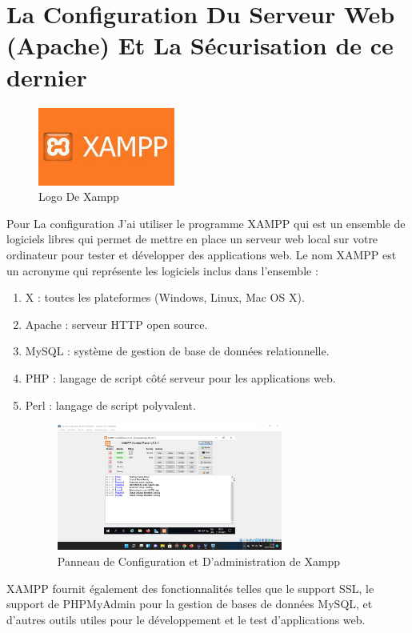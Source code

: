 \chapter{La Configuration Du Serveur Web (Apache) Et La Sécurisation de ce dernier}

\begin{figure}[h]
    \begin{center}
 \includegraphics[width=0.4\textwidth]{PhotoMemoire/Xampp.png}
 \caption{Logo De Xampp \cite{18}}
    \end{center}
\end{figure}
Pour La configuration J'ai utiliser le programme XAMPP qui  est un ensemble de logiciels libres qui permet de mettre en place un serveur web local sur votre ordinateur pour tester et développer des applications web. Le nom XAMPP est un acronyme qui représente les logiciels inclus dans l'ensemble :
\begin{enumerate}
	\item  X : toutes les plateformes (Windows, Linux, Mac OS X).
	\item  Apache : serveur HTTP open source.
	\item  MySQL : système de gestion de base de données relationnelle.
	\item  PHP : langage de script côté serveur pour les applications web.
	\item  Perl : langage de script polyvalent.
\begin{figure}[h]
	\begin{center}
			\includegraphics[width=0.7\textwidth]{ PhotoMemoire/Contro Panel.png}
			\caption{Panneau de Configuration et D'administration de Xampp}
	\end{center}
	\end{figure}
\end{enumerate}
XAMPP fournit également des fonctionnalités telles que le support SSL, le support de PHPMyAdmin pour la gestion de bases de données MySQL, et d'autres outils utiles pour le développement et le test d'applications web.\\

